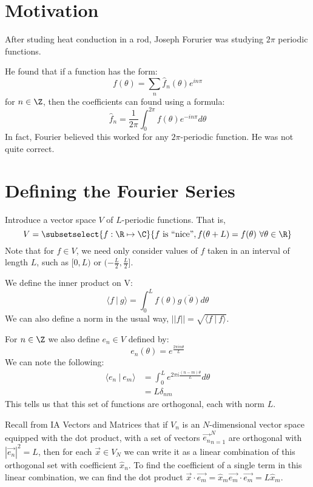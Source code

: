 \documentclass[../Main.tex]{subfiles}
\begin{document}
\section{Motivation}
After studing heat conduction in a rod, Joseph Forurier was studying $2\pi$ periodic functions.

He found that if a function has the form:
\begin{equation*}
    f(\theta) = \sum_n \hat{f}_n(\theta) e^{in\pi}
\end{equation*}
for $n \in \Z$, then the coefficients can found using a formula:
\begin{equation*}
    \hat{f}_n = \frac{1}{2\pi} \int_0^{2\pi} f(\theta) e^{-in\pi} d\theta
\end{equation*}
In fact, Fourier believed this worked for any $2\pi$-periodic function. He was not quite correct.
\section{Defining the Fourier Series}
Introduce a vector space $V$ of $L$-periodic functions. That is,
\begin{equation*}
    V = \subsetselect{f : \R \mapsto \C}{f\text{ is ``nice''}, f(\theta + L) = f(\theta)~\forall \theta \in \R}
\end{equation*}
Note that for $f \in V$, we need only consider values of $f$ taken in an interval of length $L$, such as $[0, L)$ or $(-\frac{L}{2}, \frac{L}{2}]$.

We define the inner product on V:
\begin{equation}
    \langle f~|~g\rangle = \int_0^L f(\theta) \overline{g(\theta)} d\theta
    \label{eqnInnerProdFuncs}
\end{equation}
We can also define a norm in the usual way, $||f|| = \sqrt{\langle f~|~f\rangle}$.

For $n \in \Z$ we also define $e_n \in V$ defined by:
\begin{equation}
    e_n(\theta) = e^\frac{2\pi in\theta}{L}
    \label{eqnFuncSpaceBasis}
\end{equation}
We can note the following:
\begin{align*}
    \langle e_n~|~e_m\rangle &= \int_0^L e^{2\pi i \frac{(n-m)\theta}{L}} d\theta \\
    &= L\delta_{nm}
\end{align*}
This tells us that this set of functions are orthogonal, each with norm $L$.

Recall from IA Vectors and Matrices that if $V_n$ is an $N$-dimensional vector space equipped with the dot product, with a set of vectors ${\vec{e_n}}_{n = 1}^N$ are orthogonal with $|\vec{e_n}|^2 = L$, then for each $\vec{x} \in V_N$ we can write it as a linear combination of this orthogonal set with coefficient $\hat{x}_n$. To find the coefficient of a single term in this linear combination, we can find the dot product $\vec{x} \cdot \vec{e_m} = \hat{x}_m \vec{e_m} \cdot \vec{e_m} = L\hat{x}_m$.
\end{document}
